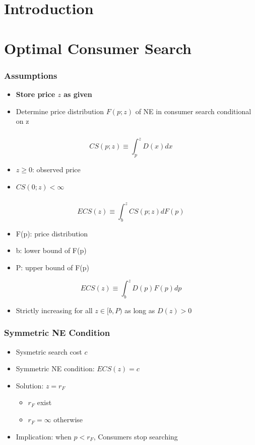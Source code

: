 \documentclass{beamer}
\begin{document}
\section{Introduction}
\begin{frame}

\end{frame}


\section{Optimal Consumer Search}

\begin{frame}
\frametitle{Assumptions}
\begin{itemize}
	\item \textbf{Store price $z$ as given}
	\item Determine price distribution $F(p;z)$ of NE in consumer search conditional on z
\end{itemize}
\end{frame}

\begin{frame}
\frametitle{}
$$
CS(p;z)\equiv \int_p^z D(x)dx
$$
\begin{itemize}
	\item $z\geq0$: observed price
	\item $CS(0;z)<\infty$
\end{itemize}
\end{frame}

\begin{frame}[allowframebreaks]
\frametitle{}
$$
ECS(z)\equiv \int_{b}^{z}CS(p;z)dF(p)
$$
\begin{itemize}
	\item F(p): price distribution
	\item b: lower bound of F(p) 
	\item P: upper bound of F(p) 
\end{itemize}
\framebreak
$$
ECS(z)\equiv \int_{b}^{z}D(p)F(p)dp
$$
\begin{itemize}
	\item Strictly increasing for all $z\in [b,P)$ as long as $D(z)>0$
\end{itemize}
\end{frame}

\begin{frame}
\frametitle{Symmetric NE Condition}
\begin{itemize}
	\item Sysmetric search cost $c$
	\item Symmetric NE condition: $ECS(z)=c$
	\item Solution: $z=r_F$
	\begin{itemize}
		\item $r_F$ exist
		\item $r_F=\infty$ otherwise
	\end{itemize}
	\item Implication: when $p<r_F$, Consumers stop searching
\end{itemize} 
\end{frame}
\end{document}
